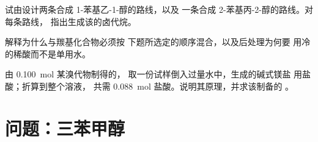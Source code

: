 \begin{exercise}[$\star\star\star$]\label{exo:b1:organomagnesium:10}
试由设计两条合成 1-苯基乙-1-醇的路线，以及
一条合成 2-苯基丙-2-醇的路线。对每条路线，
指出生成该的卤代烷。
\end{exercise}

\begin{exercise}[$\star\star\star$]\label{exo:b1:organomagnesium:11}
解释为什么与羰基化合物必须按
下题所选定的顺序混合，以及后处理为何要
用冷的稀酸而不是单用水。
\end{exercise}

\begin{exercise}[$\star\star\star$]\label{exo:b1:organomagnesium:12}
由 \qty{0.100}{mol} 某溴代物制得的，
取一份试样倒入过量水中，生成的碱式镁盐
用盐酸；折算到整个溶液，
共需 \qty{0.088}{mol} 盐酸。说明其原理，并求该制备的
。
\end{exercise}

\section{问题：三苯甲醇}

